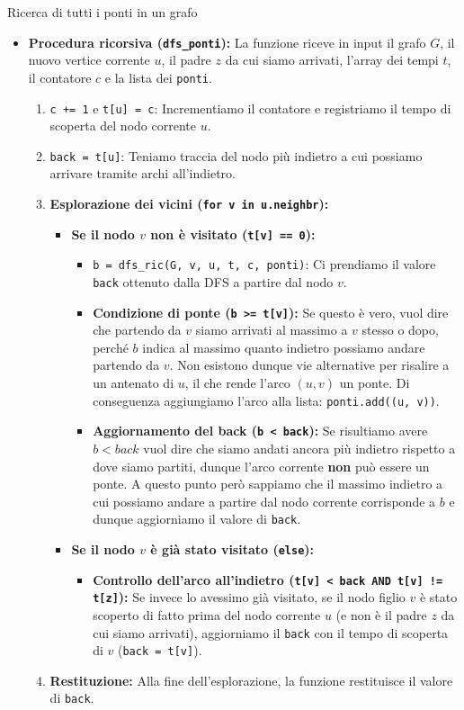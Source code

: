 \documentclass[12pt]{report}
\begin{document}
\begin{algoritmo}{Ricerca di tutti i ponti in un grafo}{}
\begin{itemize}
			\item \textbf{Procedura ricorsiva (\texttt{dfs\_ponti}):}
			La funzione riceve in input il grafo $G$, il nuovo vertice corrente $u$, il padre $z$ da cui siamo arrivati, l'array dei tempi $t$, il contatore $c$ e la lista dei \texttt{ponti}.
			\begin{enumerate}
				\item \texttt{c += 1} e \texttt{t[u] = c}: Incrementiamo il contatore e registriamo il tempo di scoperta del nodo corrente $u$.
				\item \texttt{back = t[u]}: Teniamo traccia del nodo più indietro a cui possiamo arrivare tramite archi all'indietro.
				\item \textbf{Esplorazione dei vicini (\texttt{for v in u.neighbr}):}
				\begin{itemize}
					\item \textbf{Se il nodo $v$ non è visitato (\texttt{t[v] == 0}):}
					\begin{itemize}
						\item \texttt{b = dfs\_ric(G, v, u, t, c, ponti)}: Ci prendiamo il valore \texttt{back} ottenuto dalla DFS a partire dal nodo $v$.
						\item \textbf{Condizione di ponte (\texttt{b >= t[v]}):} Se questo è vero, vuol dire che partendo da $v$ siamo arrivati al massimo a $v$ stesso o dopo, perché $b$ indica al massimo quanto indietro possiamo andare partendo da $v$. Non esistono dunque vie alternative per risalire a un antenato di $u$, il che rende l'arco $(u, v)$ un ponte. Di conseguenza aggiungiamo l'arco alla lista: \texttt{ponti.add((u, v))}.
						\item \textbf{Aggiornamento del back (\texttt{b < back}):} Se risultiamo avere $b < back$ vuol dire che siamo andati ancora più indietro rispetto a dove siamo partiti, dunque l'arco corrente \textbf{non} può essere un ponte. A questo punto però sappiamo che il massimo indietro a cui possiamo andare a partire dal nodo corrente corrisponde a $b$ e dunque aggiorniamo il valore di \texttt{back}.
					\end{itemize}
					\item \textbf{Se il nodo $v$ è già stato visitato (\texttt{else}):}
					\begin{itemize}
						\item \textbf{Controllo dell'arco all'indietro (\texttt{t[v] < back AND t[v] != t[z]}):} Se invece lo avessimo già visitato, se il nodo figlio $v$ è stato scoperto di fatto prima del nodo corrente $u$ (e non è il padre $z$ da cui siamo arrivati), aggiorniamo il \texttt{back} con il tempo di scoperta di $v$ (\texttt{back = t[v]}).
					\end{itemize}
				\end{itemize}
				\item \textbf{Restituzione:} Alla fine dell'esplorazione, la funzione restituisce il valore di \texttt{back}.
			\end{enumerate}
		\end{itemize}
	\end{algoritmo}
	
\end{document}
